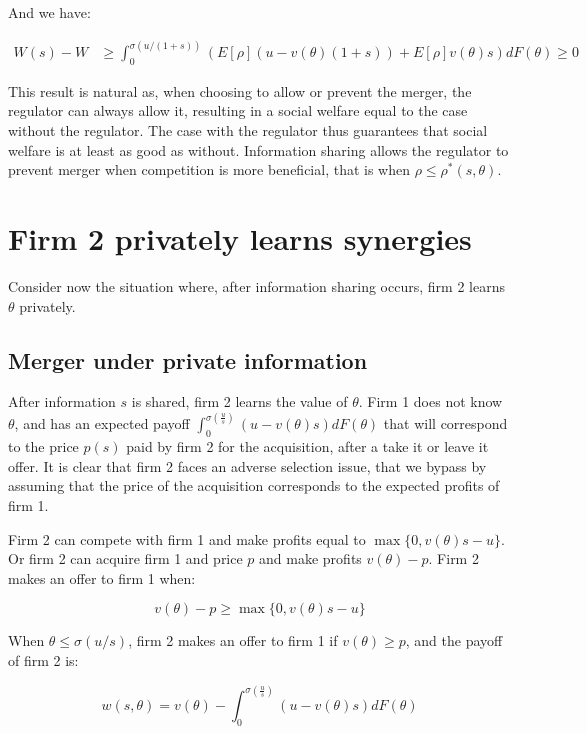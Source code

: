 \documentclass[a4paper,leqno]{article}%
\renewcommand{\t}{\theta}
\newcommand{\s}{\sigma}
\begin{document}
\medskip

And we have:

\begin{equation}
    \begin{aligned}
    W(s)-W&\geq \int_{0}^{\s(u/(1+s))}(E[\rho](u-v(\t)(1+s))+E[\rho]v(\t)s)dF(\t)\geq 0
    \end{aligned}
\end{equation}


This result is natural as, when choosing to allow or prevent the merger, the regulator can always allow it, resulting in a social welfare equal to the case without the regulator. The case with the regulator thus guarantees that social welfare is at least as good as without. Information sharing allows the regulator to prevent merger when competition is more beneficial, that is when $\rho \leq \rho^*(s,\t)$.


\section{Firm 2 privately learns synergies}

Consider now the situation where, after information sharing occurs, firm 2 learns $\t$ privately. 

\subsection{Merger under private information}

After information $s$ is shared, firm 2 learns the value of $\t$. Firm 1 does not know $\t$, and has an expected payoff $\int_{0}^{\s(\frac{u}{s})}(u-v(\t)s)dF(\t)$ that will correspond to the price $p(s)$ paid by firm 2 for the acquisition, after a take it or leave it offer. It is clear that firm 2 faces an adverse selection issue, that we bypass by assuming that the price of the acquisition corresponds to the expected profits of firm 1. 


\medskip

Firm 2 can compete with firm 1 and make profits equal to $\max\{0,v(\t)s-u\}$. Or firm 2 can acquire firm 1 and price $p$ and make profits $v(\t)-p$. Firm 2 makes an offer to firm 1 when:

\[
v(\t)-p\geq \max\{0,v(\t)s-u\}
\]

When $\t\leq \s(u/s)$, firm 2 makes an offer to firm 1 if $v(\t)\geq p$, and the payoff of firm 2 is:

\[
w(s,\t)=v(\t)-\int_{0}^{\s(\frac{u}{s})}(u-v(\t)s)dF(\t)
\]
\end{document}
